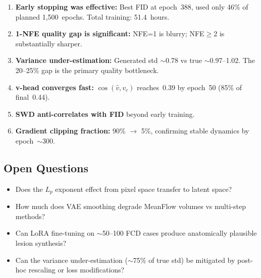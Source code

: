 \documentclass[11pt,a4paper]{article}
\begin{document}
\begin{enumerate}[nosep]
  \item \textbf{Early stopping was effective:} Best FID at epoch~388,
    used only 46\% of planned 1,500~epochs. Total training: 51.4~hours.
  \item \textbf{1-NFE quality gap is significant:} NFE=1 is blurry;
    NFE$\geq$2 is substantially sharper.
  \item \textbf{Variance under-estimation:} Generated std ${\sim}$0.78 vs
    true ${\sim}$0.97--1.02.  The 20--25\% gap is the primary quality
    bottleneck.
  \item \textbf{v-head converges fast:} $\cos(\hat{v},v_c)$ reaches~0.39 by
    epoch~50 (85\% of final~0.44).
  \item \textbf{SWD anti-correlates with FID} beyond early training.
  \item \textbf{Gradient clipping fraction:} 90\% $\to$ 5\%, confirming stable
    dynamics by epoch~${\sim}300$.
\end{enumerate}

\subsection{Open Questions}

\begin{itemize}[nosep]
  \item Does the $L_p$ exponent effect from pixel space transfer to latent
    space?
  \item How much does VAE smoothing degrade MeanFlow volumes vs multi-step
    methods?
  \item Can LoRA fine-tuning on ${\sim}$50--100 FCD cases produce anatomically
    plausible lesion synthesis?
  \item Can the variance under-estimation (${\sim}$75\% of true std) be
    mitigated by post-hoc rescaling or loss modifications?
\end{itemize}
\end{document}
